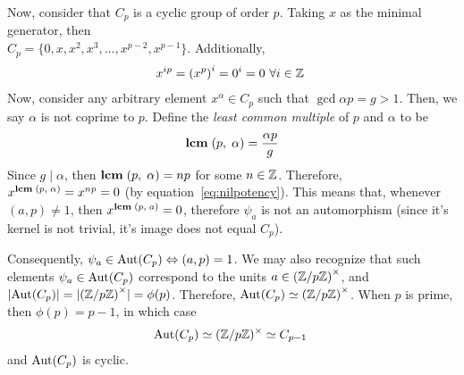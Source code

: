Now, consider that $C_p$ is a cyclic group of order $p$.
Taking $x$ as the minimal generator,
then  \\ $C_p = \{0, x, x^2, x^3, \ldots, x^{p-2}, x^{p-1}\}$.
Additionally,
\begin{align}
  x^{ip} = {(x^p)}^i = 0^i = 0\, \, \forall i \in \mathbb{Z}~\label{eq:nilpotency}
\end{align}
Now, consider any arbitrary element $x^\alpha \in C_p$
such that $\gcd{\alpha}{p} = g > 1$. Then, we say $\alpha$ is not coprime to $p$.
Define the \emph{least common multiple} of
$p$ and $\alpha$ to be
\[
  \mathbf{lcm}\;(p,\;\alpha) = \frac{\alpha p}{g}
\]
Since $g \mid \alpha$, then $\mathbf{lcm}\;(p,\;\alpha) = np$ for some $n \in \mathbb{Z}$.
Therefore, $x^{\mathbf{lcm}\;(p,\;\alpha)} = x^{np} = 0$ (by equation~\ref{eq:nilpotency}).
This means that, whenever $(a, p) \ne 1$, then $x^{\mathbf{lcm}\;(p,\;a)} = 0$,
therefore $\psi_a$ is not an automorphism (since it's kernel is not trivial,
it's image does not equal $C_p$).

Consequently, $\psi_a \in \operatorname{Aut}(C_p) \Leftrightarrow (a, p) = 1$.
We may also recognize that such elements $\psi_a \in \operatorname{Aut}(C_p)$
correspond to the units $a \in {(\mathbb{Z}/p\mathbb{Z})}^\times$,
and $\lvert\operatorname{Aut}(C_p)\rvert = \lvert{(\mathbb{Z}/p\mathbb{Z})}^\times\rvert = \phi(p)$.
Therefore, $\operatorname{Aut}(C_p) \simeq {(\mathbb{Z}/p\mathbb{Z})}^\times$.
When $p$ is prime, then $\phi(p) = p-1$,
in which case
\begin{align}
  \operatorname{Aut}(C_p) \simeq (\mathbb{Z}/p\mathbb{Z})^\times \simeq C_{p-1}~\label{eqn:aut_p}
\end{align}
and $\operatorname{Aut}(C_p)$ is cyclic.

